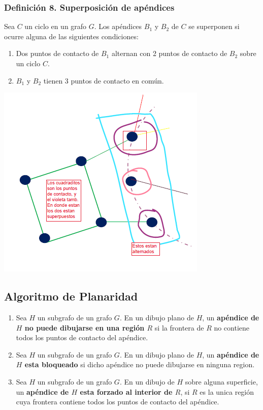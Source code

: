 \documentclass{article}
\newcommand{\bld}[1]{\textbf{#1}}
\begin{document}
\subsubsection*{Definición 8. Superposición de apéndices}
Sea $C$ un ciclo en un grafo $G$. Los apéndices $B_1$ y $B_2$ de $C$ se superponen si ocurre alguna
de las siguientes condiciones:
\begin{enumerate}
    \item Dos puntos de contacto de $B_1$ alternan con 2 puntos de contacto de $B_2$ sobre un ciclo $C$.
    \item $B_1$ y $B_2$ tienen 3 puntos de contacto en común.
\end{enumerate}
\begin{center}
    \includegraphics[width=.40\textwidth]{apendicesSuperpuestos.PNG}
\end{center}

\subsection{Algoritmo de Planaridad}
\begin{enumerate}
    \item Sea $H$ un subgrafo de un grafo $G$. En un dibujo plano de $H$, un \bld{apéndice de
$H$ no puede dibujarse en una región $R$} si la frontera de $R$ no contiene todos los
puntos de contacto del apéndice.
    \item  Sea $H$ un subgrafo de un grafo $G$. En un dibujo plano de $H$, un \bld{apéndice
de $H$ esta bloqueado} si dicho apéndice no puede dibujarse en ninguna region.
    \item Sea $H$ un subgrafo de un grafo $G$. En un dibujo de $H$ sobre alguna superficie,
un \bld{apéndice de $H$ esta forzado al interior de $R$}, si $R$ es la unica región cuya
frontera contiene todos los puntos de contacto del apéndice.
\end{enumerate}
\end{document}
